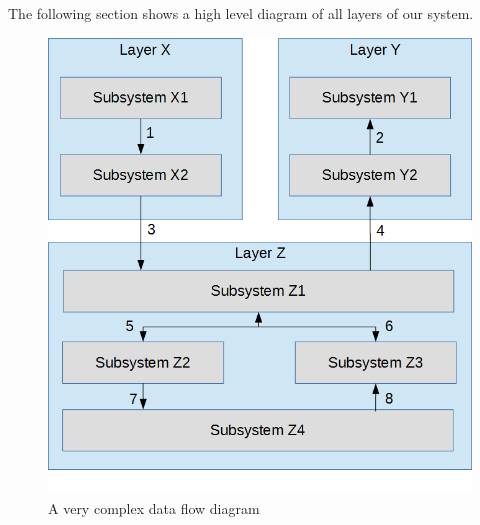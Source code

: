 The following section shows a high level diagram of all layers of our system.
\begin{figure}[h!]
	\centering
 	\includegraphics[width=\textwidth]{images/data_flow}
 \caption{A very complex data flow diagram}
\end{figure}
